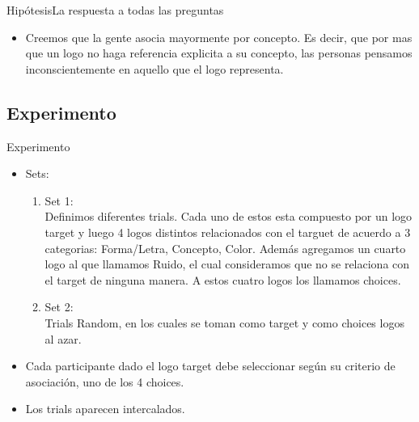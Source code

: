 \documentclass{beamer}
\begin{document}
\begin{frame}{Hipótesis}{La respuesta a todas las preguntas}
  \begin{itemize}
  \item {

Creemos que la gente asocia mayormente por concepto. Es decir, que por mas que un logo no haga referencia explicita a su concepto, las personas pensamos inconscientemente en aquello que el logo representa. 


  }

 
  \end{itemize}
\end{frame}

\subsection{Experimento}

\begin{frame}{Experimento}

\begin{itemize}
\item{Sets: 
	\begin{enumerate}
	\item {Set 1: \\
	Definimos diferentes trials. Cada uno de estos esta compuesto por un logo target y luego 4 logos distintos relacionados con el targuet de acuerdo a 3 categorias: Forma/Letra, Concepto, Color. Además agregamos un cuarto logo al que llamamos Ruido, el cual consideramos que no se relaciona con el target de ninguna manera. A estos cuatro logos los llamamos choices.
    \pause %
  }
	\item {Set 2: \\
Trials Random, en los cuales se toman como target y como choices logos al azar. 
	}
\end{enumerate} 
}
 \pause 
\item {
	Cada participante dado el logo target debe seleccionar según su criterio de asociación, uno de los 4 choices.
  }
    \pause %
\item {Los trials aparecen intercalados.  
}



\end{itemize}



  

\end{frame}
\end{document}

